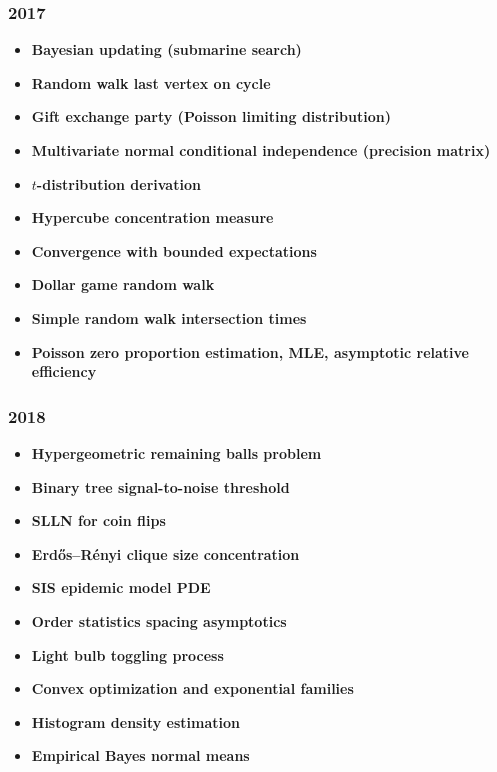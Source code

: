 \subsubsection*{2017}
\begin{itemize}
    \item \textbf{Bayesian updating (submarine search)}
    \item \textbf{Random walk last vertex on cycle}
    \item \textbf{Gift exchange party (Poisson limiting distribution)}
    \item \textbf{Multivariate normal conditional independence (precision matrix)}
    \item \textbf{$t$-distribution derivation}
    \item \textbf{Hypercube concentration measure}
    \item \textbf{Convergence with bounded expectations}
    \item \textbf{Dollar game random walk}
    \item \textbf{Simple random walk intersection times}
    \item \textbf{Poisson zero proportion estimation, MLE, asymptotic relative efficiency}
\end{itemize}

\subsubsection*{2018}
\begin{itemize}
    \item \textbf{Hypergeometric remaining balls problem}
    \item \textbf{Binary tree signal-to-noise threshold}
    \item \textbf{SLLN for coin flips}
    \item \textbf{Erd\H{o}s--R\'enyi clique size concentration}
    \item \textbf{SIS epidemic model PDE}
    \item \textbf{Order statistics spacing asymptotics}
    \item \textbf{Light bulb toggling process}
    \item \textbf{Convex optimization and exponential families}
    \item \textbf{Histogram density estimation}
    \item \textbf{Empirical Bayes normal means}
\end{itemize}

